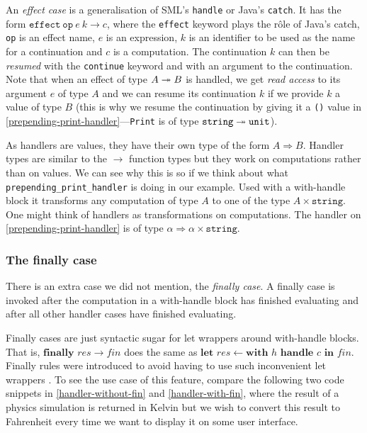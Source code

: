 \documentclass[class=article, crop=false]{standalone}
\begin{document}
An \emph{effect case} is a generalisation of SML's \verb|handle| or Java's
\verb|catch|. It has the form $\mathtt{effect}\ \mathtt{op}\ e\ k \to c$, where
the \texttt{effect} keyword plays the rôle of Java's catch, \texttt{op} is an
effect name, $e$ is an expression, $k$ is an identifier to be used as the name
for a continuation and $c$ is a computation. The continuation $k$ can then be
\emph{resumed} with the \verb|continue| keyword and with an argument to the
continuation. Note that when an effect of type $A \twoheadrightarrow B$ is handled, we get
\emph{read access} to its argument $e$ of type $A$ and we can resume its
continuation $k$ if we provide $k$ a value of type $B$ (this is why we resume
the continuation by giving it a \lstinline{()} value in
\autoref{prepending-print-handler}---\lstinline{Print} is of type
$\mathtt{string} \twoheadrightarrow \mathtt{unit}$).

As handlers are values, they have their own type of the form $A \Rightarrow B$.
Handler types are similar to the $\to$ function types but they work on
computations rather than on values. We can see why this is so if we think about
what \lstinline|prepending_print_handler| is doing in our example. Used with a
with-handle block it transforms any computation of type $A$ to one of the type
$A \times \mathtt{string}$. One might think of handlers as transformations on
computations. The handler on \autoref{prepending-print-handler} is of type
$\alpha \Rightarrow \alpha \times \mathtt{string}$.

\subsubsection{The finally case}

There is an extra case we did not mention, the \emph{finally case}. A finally
case is invoked after the computation in a with-handle block has finished
evaluating and after all other handler cases have finished evaluating.

Finally cases are just syntactic sugar for let wrappers around with-handle blocks.
That is, $\textbf{finally } \mathit{res} \to \mathit{fin}$ does the same as
$\textbf{let } \mathit{res} \leftarrow \textbf{with } h \textbf{ handle } c
\textbf{ in } \mathit{fin}$.
Finally rules were introduced to avoid having to use such inconvenient let
wrappers \cite{bauer2015programming}. To see the use case of this feature,
compare the following two code snippets in \autoref{handler-without-fin} and \autoref{handler-with-fin}, where the result of a physics
simulation is returned in Kelvin but we wish to convert this result to
Fahrenheit every time we want to display it on some user interface.
\end{document}
